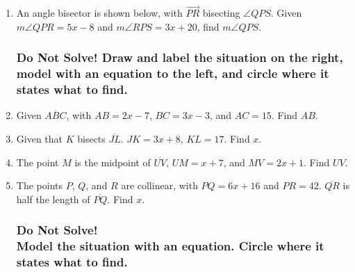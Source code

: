 \begin{enumerate}
\item An angle bisector is shown below, with $\overrightarrow{PR}$ bisecting $\angle QPS$. Given $m\angle QPR = 5x-8$ and $m\angle RPS = 3x+20$, find $m\angle QPS$.
    \begin{flushright}
    \end{flushright}

\newpage   
  \subsubsection*{Do Not Solve! Draw and label the situation on the right, model with an equation to the left, and circle where it states what to find.}
  \vspace{0.5cm}

\item Given $\overline{ABC}$, with $AB=2x-7$, $BC=3x-3$, and $AC=15$. Find ${AB}$.
\vspace{4cm}

\item Given that $K$ bisects $\overline{JL}$. $JK=3x+8$, $KL=17$. Find ${x}$.
\vspace{4cm}

\item The point $M$ is the midpoint of $\overline{UV}$, $UM=x+7$, and $MV=2x+1$. Find ${UV}$.
\vspace{4cm}

\item The points $P$, $Q$, and $R$ are collinear, with $PQ=6x+16$ and $PR=42$. $\overline{QR}$ is half the length of $\overline{PQ}$. Find ${x}$.

\newpage
\subsubsection*{Do Not Solve! \\
Model the situation with an equation. Circle where it states what to find.}


\end{enumerate}
